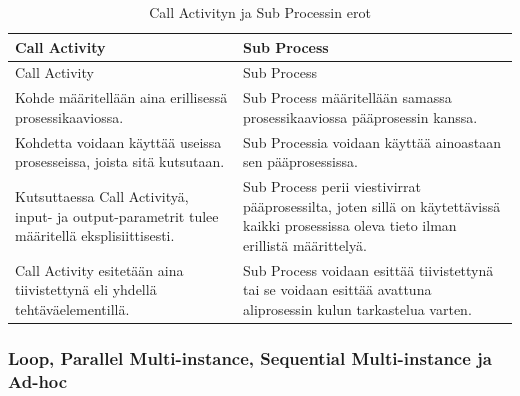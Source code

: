 \documentclass[
  finnish,
  letterpaper,
  DIV=11,
  numbers=noendperiod,
  oneside]{scrreprt}
\begin{document}
\begin{longtable}[]{@{}
  >{\raggedright\arraybackslash}p{}
  >{\raggedright\arraybackslash}p{}@{}}
\caption{Call Activityn ja Sub Processin
erot}\label{tbl-call-activity-sub-process}\tabularnewline
\toprule\noalign{}
\begin{minipage}[b]{\linewidth}\raggedright
Call Activity
\end{minipage} & \begin{minipage}[b]{\linewidth}\raggedright
Sub Process
\end{minipage} \\
\midrule\noalign{}
\endfirsthead
\toprule\noalign{}
\begin{minipage}[b]{\linewidth}\raggedright
Call Activity
\end{minipage} & \begin{minipage}[b]{\linewidth}\raggedright
Sub Process
\end{minipage} \\
\midrule\noalign{}
\endhead
\bottomrule\noalign{}
\endlastfoot
Kohde määritellään aina erillisessä prosessikaaviossa. & Sub Process
määritellään samassa prosessikaaviossa pääprosessin kanssa. \\
Kohdetta voidaan käyttää useissa prosesseissa, joista sitä kutsutaan. &
Sub Processia voidaan käyttää ainoastaan sen pääprosessissa. \\
Kutsuttaessa Call Activityä, input- ja output-parametrit tulee
määritellä eksplisiittisesti\sidenotemark{}. & Sub
Process perii viestivirrat pääprosessilta, joten sillä on käytettävissä
kaikki prosessissa oleva tieto ilman erillistä määrittelyä. \\
Call Activity esitetään aina tiivistettynä eli yhdellä
tehtäväelementillä. & Sub Process voidaan esittää tiivistettynä tai se
voidaan esittää avattuna aliprosessin kulun tarkastelua varten. \\
\end{longtable}


\subsubsection{Loop, Parallel Multi-instance, Sequential Multi-instance
ja
Ad-hoc}\label{loop-parallel-multi-instance-sequential-multi-instance-ja-ad-hoc}
\end{document}

